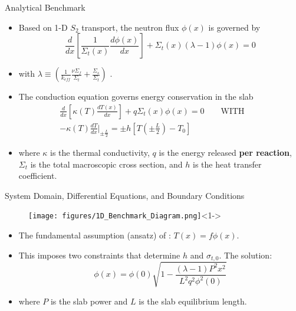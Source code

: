 \documentclass[9pt,t]{beamer}
\newcommand{\QWITH}{\qquad \text{WITH} \qquad}
\begin{document}
\begin{frame}{Analytical Benchmark}
    \begin{itemize}
        \item <1-> Based on 1-D $S_{2}$ transport, the neutron flux $\phi(x)$ is governed by
        \begin{equation}
            \frac{d}{dx}\left\lbrack\frac{1}{\Sigma_{t}(x)} \frac{d\phi(x)}{dx} \right\rbrack + \Sigma_{t}(x)
            \left(\lambda - 1\right)\phi(x) = 0
        \end{equation}
        \item <1-> with $\lambda \equiv (\frac{1}{k_{eff}}\frac{\nu \Sigma_{f}}{\Sigma_{t}} + \frac{\Sigma_{s}}{\Sigma_{t}} )$ \cite{analytical-benchmark}.
        \item <2->  The conduction equation governs energy conservation in the slab
        \begin{multline}
            \frac{d}{dx}\left\lbrack\kappa(T)\frac{dT(x)}{dx}\right\rbrack + q \Sigma_{t}(x)\phi(x) = 0
            \QWITH \\
            -\kappa(T) \frac{dT}{dx} \bigg|_{\pm \frac{L}{2}} = \pm h\left[ T(\pm \frac{L}{2}) - T_{0}\right]
        \end{multline}
        \item <2-> where $\kappa$ is the thermal conductivity, $q$ is the energy released \textbf{per reaction}, $\Sigma_{t}$ is the total macroscopic cross section, and $h$ is the heat transfer coefficient.
    \end{itemize}
\end{frame}


\begin{frame}{System Domain, Differential Equations, and Boundary Conditions}
    \vspace*{-0.45cm}
    \begin{figure}[T]
        \centering
        \texttt{[image: figures/1D\_Benchmark\_Diagram.png]}<1->
    \end{figure}
    \begin{itemize}
        \item <2-> The fundamental assumption (ansatz) of \cite{analytical-benchmark}: $T(x)=f\phi(x)$.
        \item <3-> This imposes two constraints that determine $h$ and $\sigma_{t,0}$. The solution:
        \begin{equation}
            \phi(x) = \phi(0) \sqrt{1 - \frac{(\lambda - 1)P^{2}x^{2}}{L^{2}q^{2}\phi^2(0)}}
        \end{equation}
        \item <3-> where $P$ is the slab power and $L$ is the slab equilibrium length.
    \end{itemize}
\end{frame}
\end{document}
